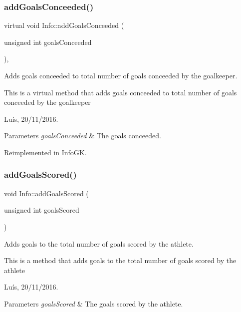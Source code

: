 \subsubsection{\texorpdfstring{add\+Goals\+Conceeded()}{addGoalsConceeded()}}
{\footnotesize\ttfamily virtual void Info\+::add\+Goals\+Conceeded (\begin{DoxyParamCaption}\item[{unsigned int}]{goals\+Conceeded }\end{DoxyParamCaption})\hspace{0.3cm}{\ttfamily [inline]}, {\ttfamily [virtual]}}



Adds goals conceeded to total number of goals conceeded by the goalkeeper. 

This is a virtual method that adds goals conceeded to total number of goals conceeded by the goalkeeper

Luís, 20/11/2016. 


\begin{DoxyParams}{Parameters}
{\em goals\+Conceeded} & The goals conceeded. \\
\hline
\end{DoxyParams}


Reimplemented in \hyperlink{class_info_g_k_aa29eeb0025487da9106007246478a0b5}{Info\+GK}.

\hypertarget{class_info_a19c376ed8c02c94f7836f1b61c0e1008}{}\label{class_info_a19c376ed8c02c94f7836f1b61c0e1008} 
\subsubsection{\texorpdfstring{add\+Goals\+Scored()}{addGoalsScored()}}
{\footnotesize\ttfamily void Info\+::add\+Goals\+Scored (\begin{DoxyParamCaption}\item[{unsigned int}]{goals\+Scored }\end{DoxyParamCaption})}



Adds goals to the total number of goals scored by the athlete. 

This is a method that adds goals to the total number of goals scored by the athlete

Luís, 20/11/2016. 


\begin{DoxyParams}{Parameters}
{\em goals\+Scored} & The goals scored by the athlete. \\
\hline
\end{DoxyParams}
\hypertarget{class_info_ad90cc81b8a235763cf4127d90aa3a66a}{}\label{class_info_ad90cc81b8a235763cf4127d90aa3a66a} 
